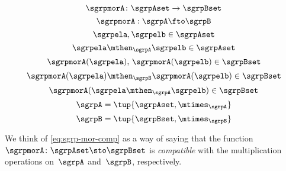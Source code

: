 \begin{forslides}
  \begin{equation}\label{eq:semigroup-mor-func}
     \sgrpmorA\colon \sgrpAset \to \sgrpBset
      \end{equation}
        \begin{equation}\label{eq:semigroup-mor-mor}
     \sgrpmorA: \sgrpA \fto \sgrpB
      \end{equation}
\begin{equation}\label{eq:sgrslides_xy}
\sgrpela, \sgrpelb \in \sgrpAset
\end{equation}
\begin{equation}\label{eq:sgrslides_xty}
\sgrpela \mthen_\sgrpA \sgrpelb \in \sgrpAset
\end{equation}
\begin{equation}\label{eq:sgrslides_fxfy}
\sgrpmorA(\sgrpela),\, \sgrpmorA( \sgrpelb) \in \sgrpBset
\end{equation}
\begin{equation}\label{eq:sgrslides_fxtfy}
\sgrpmorA(\sgrpela) \mthen_\sgrpB \sgrpmorA(\sgrpelb) \in \sgrpBset
\end{equation}
\begin{equation}\label{eq:sgrslides_fxty}
\sgrpmorA(\sgrpela  \mthen_\sgrpA  \sgrpelb) \in \sgrpBset
\end{equation}
 \begin{equation}\label{eq:sgrpA}
  \sgrpA = \tup{\sgrpAset, \mtimes_\sgrpA}
   \end{equation}
   \begin{equation}\label{eq:sgrpB}
   \sgrpB = \tup{\sgrpBset, \mtimes_\sgrpB}
   \end{equation}
\end{forslides}
We think of   \cref{eq:sgrp-mor-comp} as a way of saying that the function~$\sgrpmorA\colon \sgrpAset \sto \sgrpBset$  is \emph{compatible} with the multiplication operations on~$\sgrpA$ and~$\sgrpB$, respectively.

